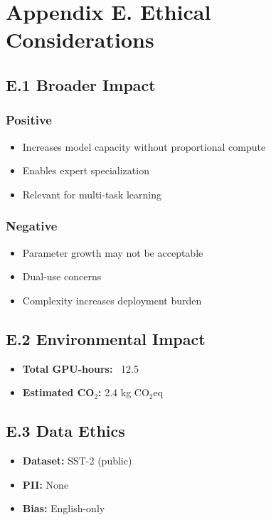 \section{Appendix E. Ethical Considerations}

\subsection{E.1 Broader Impact}

\subsubsection{Positive}
\begin{itemize}
\item Increases model capacity without proportional compute
\item Enables expert specialization
\item Relevant for multi-task learning

\end{itemize}
\subsubsection{Negative}
\begin{itemize}
\item Parameter growth may not be acceptable
\item Dual-use concerns
\item Complexity increases deployment burden

\end{itemize}
\subsection{E.2 Environmental Impact}

\begin{itemize}
\item \textbf{Total GPU-hours:} ~12.5
\item \textbf{Estimated CO$_2$:} 2.4 kg CO$_2$eq

\end{itemize}
\subsection{E.3 Data Ethics}

\begin{itemize}
\item \textbf{Dataset:} SST-2 (public)
\item \textbf{PII:} None
\item \textbf{Bias:} English-only

\end{itemize}
